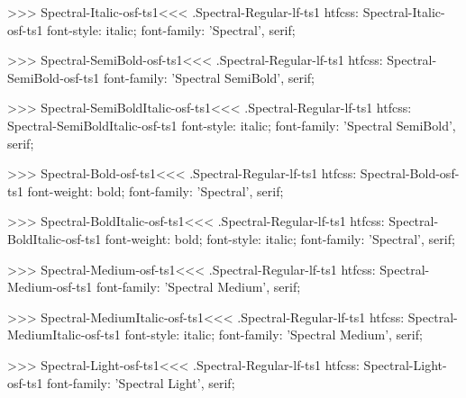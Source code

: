 >>>
\<Spectral-Italic-osf-ts1\><<<
.Spectral-Regular-lf-ts1
htfcss:  Spectral-Italic-osf-ts1  font-style: italic; font-family: 'Spectral', serif;

>>>
\<Spectral-SemiBold-osf-ts1\><<<
.Spectral-Regular-lf-ts1
htfcss:  Spectral-SemiBold-osf-ts1  font-family: 'Spectral SemiBold', serif;

>>>
\<Spectral-SemiBoldItalic-osf-ts1\><<<
.Spectral-Regular-lf-ts1
htfcss:  Spectral-SemiBoldItalic-osf-ts1  font-style: italic; font-family: 'Spectral SemiBold', serif;

>>>
\<Spectral-Bold-osf-ts1\><<<
.Spectral-Regular-lf-ts1
htfcss:  Spectral-Bold-osf-ts1  font-weight: bold; font-family: 'Spectral', serif;

>>>
\<Spectral-BoldItalic-osf-ts1\><<<
.Spectral-Regular-lf-ts1
htfcss:  Spectral-BoldItalic-osf-ts1  font-weight: bold; font-style: italic; font-family: 'Spectral', serif;

>>>
\<Spectral-Medium-osf-ts1\><<<
.Spectral-Regular-lf-ts1
htfcss:  Spectral-Medium-osf-ts1  font-family: 'Spectral Medium', serif;

>>>
\<Spectral-MediumItalic-osf-ts1\><<<
.Spectral-Regular-lf-ts1
htfcss:  Spectral-MediumItalic-osf-ts1  font-style: italic; font-family: 'Spectral Medium', serif;

>>>
\<Spectral-Light-osf-ts1\><<<
.Spectral-Regular-lf-ts1
htfcss:  Spectral-Light-osf-ts1  font-family: 'Spectral Light', serif;

